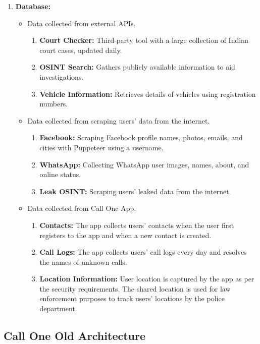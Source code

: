 \begin{enumerate}[label=\roman*.]
    \item \textbf{Database:}
    \begin{itemize}
        \item Data collected from external APIs.
        \begin{enumerate}[label=\arabic*.]
            \item \textbf{Court Checker:} Third-party tool with a large collection of Indian court cases, updated daily.
            \item \textbf{OSINT Search:} Gathers publicly available information to aid investigations.
            \item \textbf{Vehicle Information:} Retrieves details of vehicles using registration numbers.
        \end{enumerate}
        \item Data collected from scraping users' data from the internet.
        \begin{enumerate}[label=\arabic*.]
            \item \textbf{Facebook:} Scraping Facebook profile names, photos, emails, and cities with Puppeteer using a username.
            \item \textbf{WhatsApp:} Collecting WhatsApp user images, names, about, and online status.
            \item \textbf{Leak OSINT:} Scraping users' leaked data from the internet.
        \end{enumerate}
        \item Data collected from Call One App.
        \begin{enumerate}[label=\arabic*.]
            \item \textbf{Contacts:} The app collects users' contacts when the user first registers to the app and when a new contact is created.
            \item \textbf{Call Logs:} The app collects users' call logs every day and resolves the names of unknown calls.
            \item \textbf{Location Information:} User location is captured by the app as per the security requirements.
            The shared location is used for law enforcement purposes to track users' locations by the police department.
        \end{enumerate}
    \end{itemize}
\end{enumerate}

\subsection{Call One Old Architecture}\label{subsec:old-architecture}

